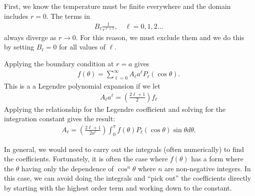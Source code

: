First, we know the temperature must be finite everywhere and the domain includes $r = 0$. The terms in
\begin{align}
  B_\ell \frac{1}{r^{\ell + 1}}, \quad \ell = 0, 1, 2 \ldots \nonumber
\end{align}
always diverge as $r \rightarrow 0$. For this reason, we must exclude them and we do this by setting $B_\ell = 0$ for all values of $\ell$.

Applying the boundary condition at $r = a$ gives
\begin{align}
  f(\theta) = \sum_{\ell = 0}^\infty A_\ell a^\ell P_\ell( \cos \theta ) . 
\end{align}
This is a a Legendre polynomial expansion if we let
\begin{align}
  A_\ell a^\ell = \left( \frac{ 2 \ell + 1 }{2 } \right) f_\ell 
\end{align}
Applying the relationship for the Legendre coefficient and solving for the integration constant gives the result:
\begin{align}
  A_\ell  = \left( \frac{ 2 \ell + 1 }{2 a^\ell } \right) \int_0^\pi f(\theta) P_\ell(\cos \theta) \sin \theta d\theta .
\end{align}

In general, we would need to carry out the integrals (often numerically) to find the coefficients. Fortunately, it is often the case where $f(\theta)$ has a form where the $\theta$ having only the dependence of $\cos^n \theta$ where $n$ are non-negative integers. In this case, we can avoid doing the integrals and ``pick out'' the coefficients directly by starting with the highest order term and working down to the constant.

